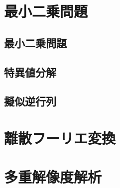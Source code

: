 \documentclass[../../main]{subfiles}
\begin{document}
\section{最小二乗問題}
\subsection{最小二乗問題}
\subsection{特異値分解}
\subsection{擬似逆行列}

\section{離散フーリエ変換}

\section{多重解像度解析}
\end{document}
